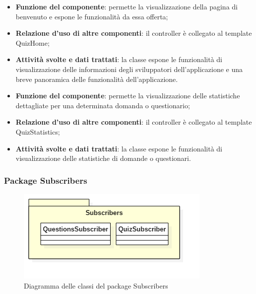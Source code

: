
\begin{itemize}
	\item\textbf{Funzione del componente}: permette la visualizzazione della pagina di benvenuto e espone le funzionalità da essa offerta;
	\item\textbf{Relazione d'uso di altre componenti}: il controller è collegato al template QuizHome;
	\item\textbf{Attività svolte e dati trattati}: la classe espone le funzionalità di visualizzazione delle informazioni degli sviluppatori dell'applicazione e una breve panoramica delle funzionalità dell'applicazione.
\end{itemize}


\begin{itemize}
	\item\textbf{Funzione del componente}: permette la visualizzazione delle statistiche
dettagliate per una determinata domanda o questionario;
	\item\textbf{Relazione d'uso di altre componenti}: il controller è collegato al template QuizStatistics;
	\item\textbf{Attività svolte e dati trattati}: la classe espone le funzionalità di visualizzazione delle statistiche di domande o questionari.
\end{itemize}


\subsubsection{Package Subscribers}
\begin{figure}[h!]
\begin{center}
	\includegraphics[scale=0.65]{../images/SubscribersClass.png}
	\caption{Diagramma delle classi del package Subscribers}
\end{center}
\end{figure}


